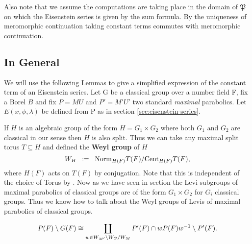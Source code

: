 Also note that we assume the computations are taking place in the domain of \(\mathfrak{P}\) on which the Eisenstein series is given by the sum formula. By the uniqueness of meromorphic continuation taking constant terms commutes with meromorphic continuation.

\subsection{In General}
We will use the following Lemmas to give a simplified expression of the constant term of an Eisenstein series. Let G be a classical group over a number field F, fix a Borel \(B\) and fix \(P = MU\) and \(P' = M'U'\) two standard \textit{maximal} parabolics. Let \(E(x, \phi, \lambda)\) be defined from P as in section \ref{sec:eisenstein-series}.


If \(H\) is an algebraic group of the form \(H= G_1\times G_2\) where both \(G_1\) and \(G_2\) are classical in our sense then \(H\) is also split. Thus we can take any maximal split torus \(T\subseteq H\) and defined the \textbf{Weyl group} of \(H\)
\[W_H\defeq \mathrm{Norm}_{H(F)} T(F) /\mathrm{Cent}_{H(F)}T(F),\] 
where \(H(F)\) acts on \(T(F)\) by conjugation. Note that this is independent of the choice of Torus by . Now as we have seen in section  the Levi subgroups of maximal parabolics of classical groups are of the form \(G_1\times G_2\) for \(G_i\) classical groups. Thus we know how to talk about the Weyl groups of Levis of maximal parabolics of classical groups.



	\begin{Lemma}\label{lem:1}
        \[P(F)\setminus G(F) \cong \coprod_{w\in W_{M'}\setminus W_G / W_{M}} P'(F)\cap wP(F)w^{-1} \setminus P'(F).\]
    \end{Lemma}

